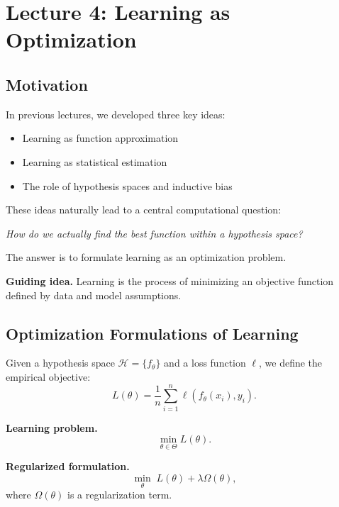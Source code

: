 \section{Lecture 4: Learning as Optimization}

\subsection{Motivation}

In previous lectures, we developed three key ideas:
\begin{itemize}
    \item Learning as function approximation
    \item Learning as statistical estimation
    \item The role of hypothesis spaces and inductive bias
\end{itemize}

\medskip

\noindent
These ideas naturally lead to a central computational question:

\medskip

\noindent
\textit{How do we actually find the best function within a hypothesis space?}

\medskip

\noindent
The answer is to formulate learning as an optimization problem.

\medskip

\noindent
\textbf{Guiding idea.}  
Learning is the process of minimizing an objective function defined by data and model assumptions.

\subsection{Optimization Formulations of Learning}

Given a hypothesis space $\mathcal{H} = \{f_\theta\}$ and a loss function $\ell$, we define the empirical objective:
\[
L(\theta) = \frac{1}{n} \sum_{i=1}^n \ell(f_\theta(x_i), y_i).
\]

\medskip

\noindent
\textbf{Learning problem.}
\[
\min_{\theta \in \Theta} L(\theta).
\]

\medskip

\noindent
\textbf{Regularized formulation.}
\[
\min_\theta \; L(\theta) + \lambda \Omega(\theta),
\]
where $\Omega(\theta)$ is a regularization term.

\medskip

